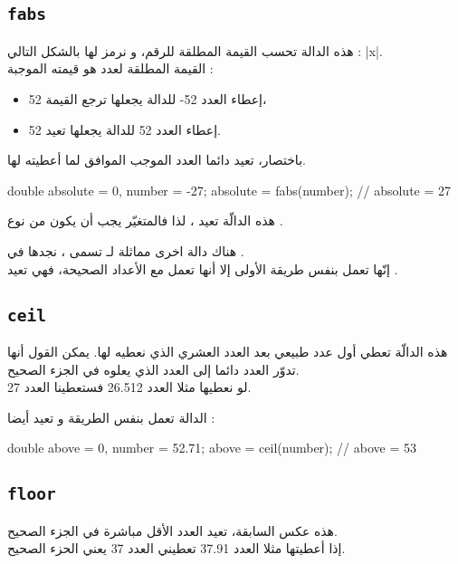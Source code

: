 \subsection{\texttt{fabs}}

هذه الدالة تحسب القيمة المطلقة للرقم، و نرمز لها بالشكل التالي : |x|.\\
القيمة المطلقة لعدد هو قيمته الموجبة :

\begin{itemize}
  \item إعطاء العدد 52- للدالة يجعلها ترجع القيمة 52،
  \item إعطاء العدد 52 للدالة يجعلها تعيد 52.
\end{itemize}

باختصار، تعيد دائما العدد الموجب الموافق لما أعطيته لها.

\begin{Console}
double absolute = 0, number = -27;
absolute = fabs(number); // absolute = 27
\end{Console}

هذه الدالّة تعيد
،
لذا فالمتغيّر
يجب أن يكون من نوع
.

\begin{information}
هناك دالة اخرى مماثلة لـ
تسمى
،
نجدها في
.\\
إنّها تعمل بنفس طريقة الأولى إلا أنها تعمل مع الأعداد الصحيحة، فهي تعيد
.
\end{information}

\subsection{\texttt{ceil}}

هذه الدالّة تعطي أول عدد طبيعي بعد العدد العشري الذي نعطيه لها. يمكن القول أنها تدوّر العدد دائما إلى العدد الذي يعلوه في الجزء الصحيح.\\
لو نعطيها مثلا العدد 26.512 فستعطينا العدد 27.

الدالة تعمل بنفس الطريقة و تعيد
أيضا :

\begin{Csource}
double above = 0, number = 52.71;
above = ceil(number); // above = 53
\end{Csource}

\subsection{\texttt{floor}}
هذه عكس السابقة، تعيد العدد الأقل مباشرة في الجزء الصحيح.\\
إذا أعطيتها مثلا العدد 37.91 تعطيني العدد 37 يعني الحزء الصحيح.

